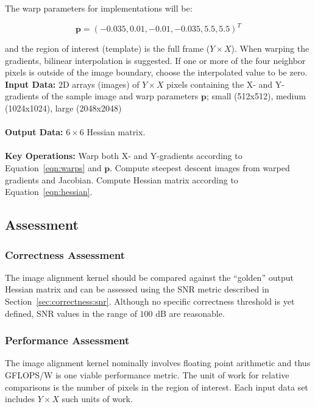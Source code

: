 \documentclass{report}
\begin{document}
The warp parameters for implementations will be:

\begin{equation*}
  \textbf{p} = (-0.035, 0.01, -0.01, -0.035, 5.5, 5.5)^{T}
\label{eqn:warp_params}
\end{equation*}

\noindent and the region of interest (template) is the full frame ($Y \times X$).
When warping the gradients, bilinear interpolation is suggested.  If one or more of the four
neighbor pixels is outside of the image boundary, choose the interpolated value to be zero.\\

\noindent \textbf{Input Data:} 2D arrays (images) of $Y \times X$ pixels containing the
X- and Y-gradients of the sample image and warp parameters $\textbf{p}$;
small (512x512), medium (1024x1024), large (2048x2048)\\ \\
\textbf{Output Data:} $6 \times 6$ Hessian matrix. \\ \\
\textbf{Key Operations:} Warp both X- and Y-gradients according to Equation~\ref{eqn:warps} and $\textbf{p}$.
Compute steepest descent images from warped gradients and Jacobian.  Compute Hessian matrix according
to Equation~\ref{eqn:hessian}.

\subsection{Assessment}

\subsubsection{Correctness Assessment}

The image alignment kernel should be compared against the ``golden'' output Hessian matrix
and can be assessed using the SNR metric described in Section~\ref{sec:correctness:snr}.
Although no specific correctness threshold is yet defined, SNR values in the
range of $100$ dB are reasonable.

\subsubsection{Performance Assessment}

The image alignment kernel nominally involves floating point arithmetic and thus
GFLOPS/W is one viable performance metric.
The unit of work for relative comparisons is the number of pixels in the region of interest.
Each input data set includes $Y \times X$ such units of work.
\end{document}
